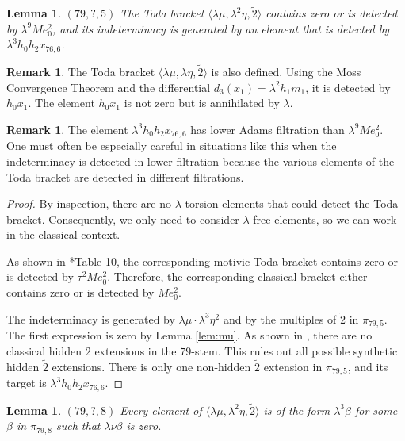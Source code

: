 \documentclass{amsart}
\newtheorem{lemma}[thm]{Lemma}
\theoremstyle{definition}
\newtheorem{rmk}[thm]{Remark}
\newcommand{\hsf}{\widetilde{2}}
\newcommand{\lemdeg}[1]{$({#1})$}
\begin{document}
\begin{lemma} 
\label{lem:h,L^2eta,Lmu}
\lemdeg{79, ?, 5}
The Toda bracket $\langle \lambda \mu, \lambda^2 \eta, \hsf \rangle$ 
contains zero or is detected by $\lambda^9 M e_0^2$, and its indeterminacy
is generated by an element that is detected by
$\lambda^3 h_0 h_2 x_{76,6}$.
\end{lemma}

\begin{rmk}
The Toda bracket
$\langle \lambda \mu, \lambda \eta, \hsf \rangle$
is also defined.
Using the Moss Convergence Theorem \cite{BK21} \cite{Moss70} and the 
differential $d_3(x_1) = \lambda^2 h_1 m_1$,
it is detected by $h_0 x_1$.
The element $h_0 x_1$ is not zero but is annihilated by $\lambda$.
\end{rmk}

\begin{rmk}
The element $\lambda^3 h_0 h_2 x_{76,6}$ has lower Adams filtration
than $\lambda^9 M e_0^2$.
One must often be especially careful in situations like this
when the indeterminacy
is detected in lower filtration because the various elements of the
Toda bracket are detected in different filtrations.
\end{rmk}

\begin{proof}
By inspection, there are no $\lambda$-torsion elements that
could detect the Toda bracket.  Consequently, we only need to
consider $\lambda$-free elements, so we can work in the classical
context.

As shown in \cite{IWX}*{Table 10},
the corresponding motivic Toda bracket
contains zero or is detected by $\tau^2 M e_0^2$.
Therefore, the corresponding classical bracket either contains
zero or is detected by $M e_0^2$.

The indeterminacy is generated by $\lambda \mu \cdot \lambda^3 \eta^2$
and by the multiples of $\hsf$ in $\pi_{79,5}$.
The first expression is zero by Lemma \ref{lem:mu}.
As shown in \cite{IWX}, there are no classical hidden $2$ extensions
in the $79$-stem.  This rules out all possible synthetic hidden $\hsf$
extensions.  There is only one non-hidden $\hsf$ extension
in $\pi_{79,5}$, and its target is $\lambda^3 h_0 h_2 x_{76,6}$.
\end{proof}

\begin{lemma}
\label{lem:beta}
\lemdeg{79, ?, 8}
Every element of $\langle \lambda \mu, \lambda^2 \eta, \hsf \rangle$
is of the form $\lambda^3 \beta$ for some $\beta$ in
$\pi_{79,8}$ such that $\lambda \nu \beta$ is zero.
\end{lemma}
\end{document}
